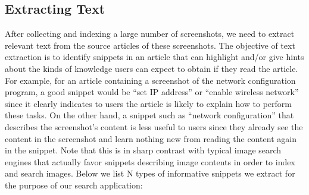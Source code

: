 \documentclass{www2010-submission}
\begin{document}
\subsection{Extracting Text}

After collecting and indexing a large number of screenshots, we need
to extract relevant text from the source articles of these
screenshots. The objective of text extraction is to identify snippets
in an article that can highlight and/or give hints about the kinds of
knowledge users can expect to obtain if they read the article. For
example, for an article containing a screenshot of the network
configuration program, a good snippet would be ``set IP address'' or
``enable wireless network'' since it clearly indicates to users the
article is likely to explain how to perform these tasks. On the other
hand, a snippet such as ``network configuration'' that describes the
screenshot's content is less useful to users since they already see
the content in the screenshot and learn nothing new from reading the
content again in the snippet. Note that this is in sharp contrast with
typical image search engines that actually favor snippets describing
image contents in order to index and search images. Below we list N
types of informative snippets we extract for the purpose of our 
search application:
\end{document}
